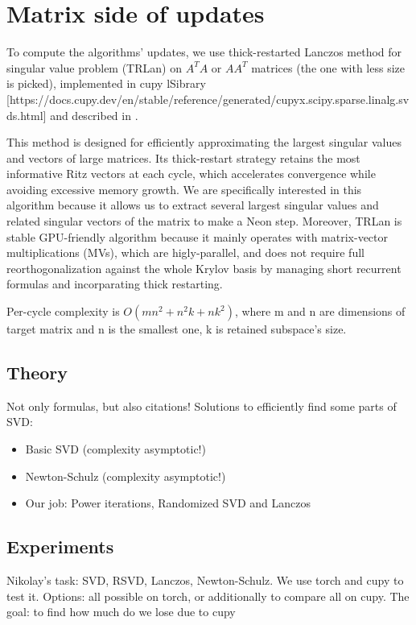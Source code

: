 \documentclass{article} %
\begin{document}
\section{Matrix side of updates}
To compute the algorithms' updates, we use thick-restarted Lanczos method for singular value problem (TRLan) on $A^TA$ or $AA^T$ matrices (the one with less size is picked), implemented in cupy lSibrary [https://docs.cupy.dev/en/stable/reference/generated/cupyx.scipy.sparse.linalg.svds.html] and described in \cite{simonz1998thick}.

This method is designed for efficiently approximating the largest singular values and vectors of large matrices. Its thick-restart strategy retains the most informative Ritz vectors at each cycle, which accelerates convergence while avoiding excessive memory growth. We are specifically interested in this algorithm because it allows us to extract several largest singular values and related singular vectors of the matrix to make a Neon step. Moreover, TRLan is stable GPU-friendly algorithm because it mainly operates with matrix-vector multiplications (MVs), which are higly-parallel, and does not require full reorthogonalization against the whole Krylov basis by managing  short recurrent formulas and incorparating thick restarting. 

Per-cycle complexity is $O(mn^2 + n^2k + nk^2)$, where m and n are dimensions of target matrix and n is the smallest one, k is retained subspace's size.

\subsection{Theory}
        Not only formulas, but also citations!
        Solutions to efficiently find some parts of SVD:
        \begin{itemize}
            \item Basic SVD (complexity asymptotic!)
            \item Newton-Schulz (complexity asymptotic!)
            \item Our job: Power iterations, Randomized SVD and Lanczos
        \end{itemize}
    \subsection{Experiments}
        Nikolay's task: SVD, RSVD, Lanczos, Newton-Schulz. We use torch and cupy to test it.
        Options: all possible on torch, or additionally to compare all on cupy. The goal: to find how much do we lose due to cupy
\end{document}
